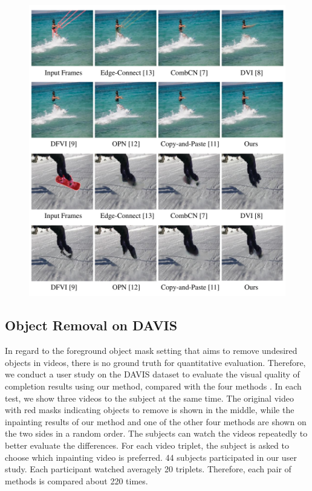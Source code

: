 \begin{figure}[!t]
	\centering
	\includegraphics[width=\columnwidth]{vis_forg} %
	\caption{}
	\label{vis_forg}
\end{figure}

\subsection{Object Removal on DAVIS}


In regard to the foreground object mask setting that aims to remove undesired objects in videos, there is no ground truth for quantitative evaluation. 
Therefore, we conduct a user study on the DAVIS dataset to evaluate the visual quality of completion results using our method, compared with the four methods \cite{nazeri2019edgeconnect,wang2019video,Kim_2019_CVPR1,Xu_2019_CVPR}.
%
In each test, we show three videos to the subject at the same time. The original video with red masks indicating objects to remove is shown in the middle, while the inpainting results of our method and one of the other four methods are shown on the two sides in a random order.
%  
The subjects can watch the videos repeatedly to better evaluate the differences.
For each video triplet, the subject is asked to choose which inpainting video is preferred.
44 subjects participated in our user study. 
Each participant watched averagely 20 triplets. 
Therefore, each pair of methods is compared about 220 times.
 

